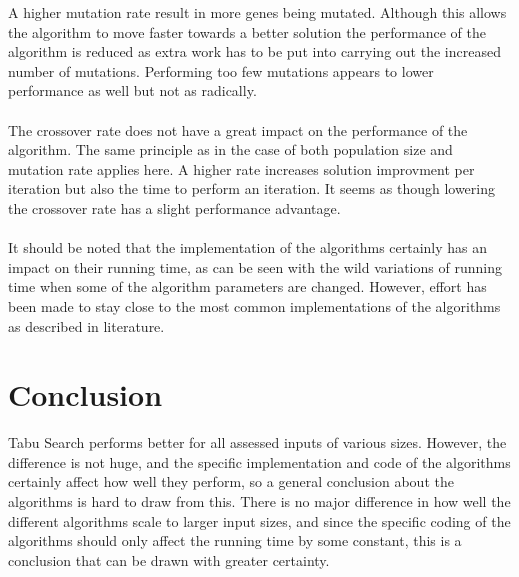 \documentclass[titlepage,a4paper]{article}
\begin{document}
A higher mutation rate result in more genes being mutated. Although this allows the algorithm to move faster towards a better solution the performance of the algorithm is reduced as extra work has to be put into carrying out the increased number of mutations. Performing too few mutations appears to lower performance as well but not as radically. \\\\
The crossover rate does not have a great impact on the performance of the algorithm. The same principle as in the case of both population size and mutation rate applies here. A higher rate increases solution improvment per iteration but also the time to perform an iteration. It seems as though lowering the crossover rate has a slight performance advantage.\\\\
It should be noted that the implementation of the algorithms certainly has an impact on their running time, as can be seen with the wild variations of running time when some of the algorithm parameters are changed. However, effort has been made to stay close to the most common implementations of the algorithms as described in literature.

\pagebreak
\section{Conclusion}
Tabu Search performs better for all assessed inputs of various sizes. However, the difference is not huge, and the specific implementation and code of the algorithms certainly affect how well they perform, so a general conclusion about the algorithms is hard to draw from this. There is no major difference in how well the different algorithms scale to larger input sizes, and since the specific coding of the algorithms should only affect the running time by some constant, this is a conclusion that can be drawn with greater certainty.

\pagebreak



\end{document}
